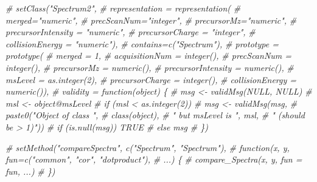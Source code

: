 \documentclass[
]{article}
\newenvironment{Shaded}{\begin{snugshade}}{\end{snugshade}}
\newcommand{\CommentTok}[1]{\textcolor[rgb]{0.56,0.35,0.01}{\textit{#1}}}
\begin{document}
\begin{Shaded}
\begin{Highlighting}[]
\CommentTok{\# setClass("Spectrum2",}
\CommentTok{\#          representation = representation(}
\CommentTok{\#              merged="numeric",}
\CommentTok{\#              precScanNum="integer",}
\CommentTok{\#              precursorMz="numeric",}
\CommentTok{\#              precursorIntensity = "numeric",}
\CommentTok{\#              precursorCharge = "integer",}
\CommentTok{\#              collisionEnergy = "numeric"),}
\CommentTok{\#          contains=c("Spectrum"),}
\CommentTok{\#          prototype = prototype(}
\CommentTok{\#              merged = 1,}
\CommentTok{\#              acquisitionNum = integer(),}
\CommentTok{\#              precScanNum = integer(),}
\CommentTok{\#              precursorMz = numeric(),}
\CommentTok{\#              precursorIntensity = numeric(),}
\CommentTok{\#              msLevel = as.integer(2),}
\CommentTok{\#              precursorCharge = integer(),}
\CommentTok{\#              collisionEnergy = numeric()),}
\CommentTok{\#          validity = function(object) \{}
\CommentTok{\#              msg \textless{}{-} validMsg(NULL, NULL)}
\CommentTok{\#              msl \textless{}{-} object@msLevel}
\CommentTok{\#              if (msl \textless{} as.integer(2))}
\CommentTok{\#                  msg \textless{}{-} validMsg(msg,}
\CommentTok{\#                                  paste0("Object of class ",}
\CommentTok{\#                                         class(object),}
\CommentTok{\#                                         " but msLevel is ", msl,}
\CommentTok{\#                                         " (should be \textgreater{} 1)"))}
\CommentTok{\#              if (is.null(msg)) TRUE}
\CommentTok{\#              else msg}
\CommentTok{\#          \})}


\CommentTok{\# setMethod("compareSpectra", c("Spectrum", "Spectrum"),}
\CommentTok{\#           function(x, y, fun=c("common", "cor", "dotproduct"),}
\CommentTok{\#                    ...) \{}
\CommentTok{\#               compare\_Spectra(x, y, fun = fun, ...)}
\CommentTok{\#           \})}


\end{Highlighting}
\end{Shaded}
\end{document}
